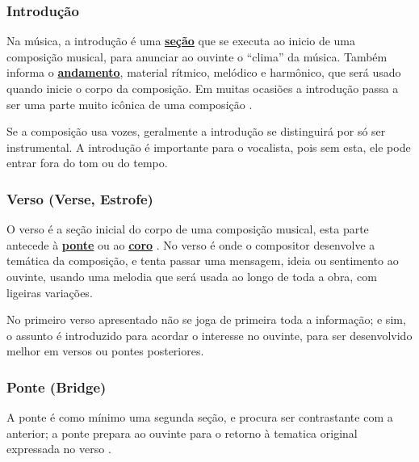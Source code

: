 \subsubsection{Introdução}
\label{ref:Introducao}
Na música, a introdução  é uma \hyperref[ref:Secao]{\textbf{seção}} que se executa ao inicio de uma composição musical,
para anunciar ao ouvinte o ``clima'' da música. Também informa o \hyperref[sec:Andamento]{\textbf{andamento}},
 material rítmico, 
melódico e harmônico, que será usado quando inicie o corpo da composição.
Em muitas ocasiões a introdução passa a ser uma parte muito icônica de uma composição
\cite[pp. 17]{adolfo1997composicao}.

Se a composição usa vozes,  geralmente a introdução se distinguirá por só ser instrumental. 
A introdução é importante para o vocalista, pois sem esta, ele pode entrar fora do tom ou do tempo. 

\subsubsection{Verso (Verse, Estrofe)}
\label{ref:Verse}
O verso é a seção inicial do corpo de uma composição musical, 
esta parte antecede à \hyperref[ref:Ponte]{\textbf{ponte}} ou ao \hyperref[ref:Coro]{\textbf{coro}}
\cite[pp. 18]{adolfo1997composicao}.
No verso é onde o compositor desenvolve a temática da composição,
e tenta passar uma mensagem, ideia ou sentimento ao ouvinte,
usando uma melodia que será usada ao longo de toda a obra, com ligeiras variações.

No primeiro verso apresentado não se joga de primeira toda a informação;
e sim, o assunto é introduzido para acordar o interesse no ouvinte,
para ser desenvolvido melhor em versos ou pontes posteriores.   

\subsubsection{Ponte (Bridge)}
\label{ref:Ponte}

A ponte é como mínimo uma segunda seção, e procura ser contrastante com a anterior; 
a ponte prepara ao ouvinte para o retorno à tematica original expressada no verso 
\cite[pp. 18]{adolfo1997composicao}.

